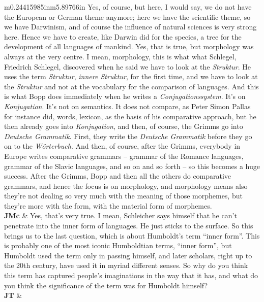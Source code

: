 \documentclass[12pt]{article}
\begin{document}
\begin{flushleft}
\begin{supertabular}{m{0.24415985in}m{5.89766in}}
Yes, of course, but here, I would say, we do not have the European or German theme anymore; here we have the scientific theme, so we have Darwinism, and of course the influence of natural sciences is very strong here. Hence we have to create, like Darwin did for the species, a tree for the development of all languages of mankind. Yes, that is true, but morphology was always at the very centre. I mean, morphology, this is what what Schlegel, Friedrich Schlegel, discovered when he said we have to look at the \textit{Struktur}. He uses the term \textit{Struktur}, \textit{innere Struktur}, for the first time, and we have to look at the \textit{Struktur} and not at the vocabulary for the comparison of languages. And this is what Bopp does immediately when he writes a \textit{Conjugationssystem}. It’s on \textit{Konjugation}. It’s not on semantics. It does not compare, as Peter Simon Pallas for instance did, words, lexicon, as the basis of his comparative approach, but he then already goes into \textit{Konjugation}, and then, of course, the Grimms go into \textit{Deutsche Grammatik}. First, they write the \textit{Deutsche Grammatik} before they go on to the \textit{Wörterbuch}. And then, of course, after the Grimms, everybody in Europe writes comparative grammars – grammar of the Romance languages, grammar of the Slavic languages, and so on and so forth – so this becomes a huge success. After the Grimms, Bopp and then all the others do comparative grammars, and hence the focus is on morphology, and morphology means also they’re not dealing so very much with the meaning of those morphemes, but they’re more with the form, with the material form of morphemes.\\
\textbf{JMc}\newline
 &
Yes, that’s very true. I mean, Schleicher says himself that he can’t penetrate into the inner form of languages. He just sticks to the surface. So this brings us to the last question, which is about Humboldt’s term “inner form”. This is probably one of the most iconic Humboldtian terms, “inner form”, but Humboldt used the term only in passing himself, and later scholars, right up to the 20th century, have used it in myriad different senses. So why do you think this term has captured people’s imaginations in the way that it has, and what do you think the significance of the term was for Humboldt himself?\\
\textbf{JT}\newline
 &

\end{supertabular}
\end{flushleft}
\end{document}
